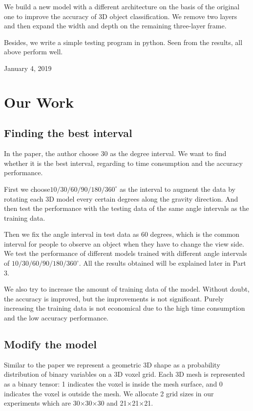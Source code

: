 \documentclass[11pt,journal,compsoc]{IEEEtran}
\begin{document}
  We build a new model with a different architecture on the basis of the original one to improve the accuracy of 3D object classification. We remove two layers and then expand the width and depth on the remaining three-layer frame.

  Besides, we write a simple testing program in python. Seen from the results, all above perform well.
  
  \hfill January 4, 2019

  \section{Our Work}
  \subsection{Finding the best interval}
  In the paper, the author choose 30 as the degree interval. We want to find whether it is the best interval, regarding to time consumption and the accuracy performance. 

  First we choose$10/30/60/90/180/360^{\circ}$ as the interval to augment the data by rotating each 3D model every certain degrees along the gravity direction. And then test the performance with the testing data of the same angle intervals as the training data. 

  Then we fix the angle interval in test data as 60 degrees, which is the common interval for people to observe an object when they have to change the view side. We test the performance of different models trained with different angle intervals of $10/30/60/90/180/360^{\circ}$. All the results obtained will be explained later in Part 3.

  We also try to increase the amount of training data of the model. Without doubt, the accuracy is improved, but the improvements is not significant. Purely increasing the training data is not economical due to the high time consumption and the low accuracy performance. 
  \subsection{Modify the model}
  Similar to the paper we represent a geometric 3D shape as a probability distribution of binary variables on a 3D voxel grid. Each 3D mesh is represented as a binary tensor: 1 indicates the voxel is inside the mesh surface, and 0 indicates the voxel is outside the mesh. We allocate 2 grid sizes in our experiments which are 30$\times$30$\times$30 and 21$\times$21$\times$21.
  
\end{document}
